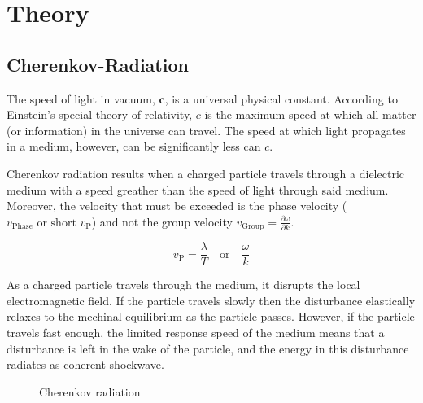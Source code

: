 \documentclass[11pt,twoside]{scrreprt}
\begin{document}

\chapter{Theory}

\section{Cherenkov-Radiation} %
\label{sec:cherenkov_radiation}

The speed of light in vacuum, \( \mathbf{c} \), is a universal physical constant. According to Einstein's special theory of relativity, \( c \) is the maximum speed at which all matter (or information) in the universe can travel. The speed at which light propagates in a medium, however, can be significantly less can \( c \).

Cherenkov radiation results when a charged particle travels through a dielectric medium with a speed greather than the speed of light through said medium. Moreover, the velocity that must be exceeded is the phase velocity (\( v_{\text{Phase}} \text{ or short } v_{\text{P}} \)) and not the group velocity \( v_{\text{Group}} = \frac{\partial \omega}{\partial k} \).

\[ v_{\text{P}} = \frac{\lambda}{T} \quad \text{or} \quad \frac{\omega}{k}\]

As a charged particle travels through the medium, it disrupts the local electromagnetic field. If the particle travels slowly then the disturbance elastically relaxes to the mechinal equilibrium as the particle passes. However, if the particle travels fast enough, the limited response speed of the medium means that a disturbance is left in the wake of the particle, and the energy in this disturbance radiates as coherent shockwave.

\begin{figure}[htbp]
  \centering
  \caption{Cherenkov radiation}
  \label{fig:label}
\end{figure}
\end{document}
